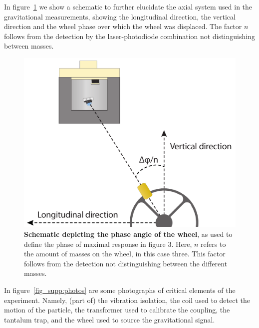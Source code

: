 \begin{appendices}
In figure~\ref{app:phase} we show a schematic to further elucidate the axial system used in the gravitational measurements, showing the longitudinal direction, the vertical direction and the wheel phase over which the wheel was displaced. The factor $n$ follows from the detection by the laser-photodiode combination not distinguishing between masses.

\begin{figure}[ht]
\centering
\includegraphics[width=1\textwidth]{Appenidx/paper_wheel_phase.pdf}%
\caption{\textbf{Schematic depicting the phase angle of the wheel}, as used to define the phase of maximal response in figure 3. Here, $n$ refers to the amount of masses on the wheel, in this case three. This factor follows from the detection not distinguishing between the different masses.}\label{app:phase}
\end{figure}

In figure~\ref{fig_supp:photos} are some photographs of critical elements of the experiment. Namely, (part of) the vibration isolation, the coil used to detect the motion of the particle, the transformer used to calibrate the coupling, the tantalum trap, and the wheel used to source the gravitational signal.


\end{appendices}
